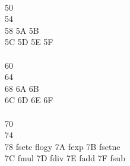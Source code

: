 \documentclass[letterpaper,10pt,openright,twoside,onecolumn]{book}
\begin{document}
\begin{tabbing}
    \\
    50 \>	 \> 	 \> 	 \> 	\\
    54 \>	 \> 	 \> 	 \> 	\\
    58 \>	 \> 	\> 5A \> 	\> 5B \> 	\\
    5C \>	\> 5D \> 	\> 5E \> 	\> 5F \> 	\\
    \\
    60 \>	 \> 	 \> 	 \> 	\\
    64 \>	 \> 	 \> 	 \> 	\\
    68 \>	 \> 	\> 6A \> 	\> 6B \> 	\\
    6C \>	\> 6D \> 	\> 6E \> 	\> 6F \> 	\\
    \\
    70 \>	 \> 	 \>	 \> 	\\
    74 \>	 \> 	 \>	 \> 	\\
    78 \> fsete	 \> flogy	\> 7A \> fexp	\> 7B \> fsetne	\\
    7C \> fmul	\> 7D \> fdiv	\> 7E \> fadd	\> 7F \> fsub	\\
  \end{tabbing}
\end{document}
